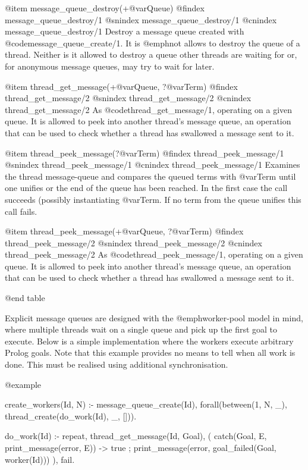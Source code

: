 {{{{{{{{{@item message_queue_destroy(+@var{Queue})
@findex message_queue_destroy/1
@snindex message_queue_destroy/1
@cnindex message_queue_destroy/1
Destroy a message queue created with @code{message_queue_create/1}.  It is
@emph{not} allows to destroy the queue of a thread.  Neither is it
allowed to destroy a queue other threads are waiting for or, for
anonymous message queues, may try to wait for later.

@item thread_get_message(+@var{Queue}, ?@var{Term})
@findex thread_get_message/2
@snindex thread_get_message/2
@cnindex thread_get_message/2
As @code{thread_get_message/1}, operating on a given queue. It is allowed to
peek into another thread's message queue, an operation that can be used
to check whether a thread has swallowed a message sent to it.

@item thread_peek_message(?@var{Term})
@findex thread_peek_message/1
@snindex thread_peek_message/1
@cnindex thread_peek_message/1
Examines the thread message-queue and compares the queued terms
with @var{Term} until one unifies or the end of the queue has been
reached.  In the first case the call succeeds (possibly instantiating
@var{Term}.  If no term from the queue unifies this call fails.

@item thread_peek_message(+@var{Queue}, ?@var{Term})
@findex thread_peek_message/2
@snindex thread_peek_message/2
@cnindex thread_peek_message/2
As @code{thread_peek_message/1}, operating on a given queue. It is allowed to
peek into another thread's message queue, an operation that can be used
to check whether a thread has swallowed a message sent to it.

@end table


Explicit message queues are designed with the @emph{worker-pool} model
in mind, where multiple threads wait on a single queue and pick up the
first goal to execute.  Below is a simple implementation where the
workers execute arbitrary Prolog goals.  Note that this example provides
no means to tell when all work is done. This must be realised using
additional synchronisation.

@example
%	

create_workers(Id, N) :-
	message_queue_create(Id),
	forall(between(1, N, _),
	       thread_create(do_work(Id), _, [])).

do_work(Id) :-
	repeat,
	  thread_get_message(Id, Goal),
	  (   catch(Goal, E, print_message(error, E))
	  ->  true
	  ;   print_message(error, goal_failed(Goal, worker(Id)))
	  ),
	fail.

}}}}}}}}}
